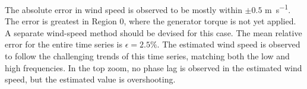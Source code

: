 \documentclass[wes, manuscript]{copernicus}
\begin{document}
The absolute error in wind speed is observed to be mostly within $\pm 0.5$ \unit{m~s^{-1}}.
The error is greatest in Region $0$, where the generator torque is not yet applied. A separate wind-speed method should be devised for this case. The mean relative error for the entire time series is $\epsilon=2.5\%$. The estimated wind speed is observed to follow the challenging trends of this time series, matching both the low and high frequencies. In the top zoom, no phase lag is observed in the estimated wind speed, but the estimated value is overshooting. 
% 
\end{document}
